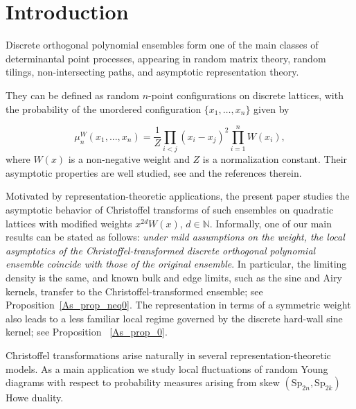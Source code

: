 \documentclass[reqno,11pt]{amsart}
\newcommand{\NN}{\mathbb{N}}
\theoremstyle{plain}
\theoremstyle{definition}
\numberwithin{equation}{section}
\begin{document}
\section{Introduction}

Discrete orthogonal polynomial ensembles form one of the main classes of determinantal point processes, appearing in random matrix theory, random tilings, non-intersecting paths, and asymptotic representation theory.

They can be defined as random $n$-point configurations on discrete lattices, with the probability of the unordered configuration $\{x_1,\ldots,x_n\}$ given by

$$
\mu^{W}_n(x_1,...,x_n)=\frac{1}{Z}\prod\limits_{i<j}(x_i-x_j)^2\prod\limits_{i=1}^n W(x_i),
$$
where $W(x)$ is a non-negative weight and $Z$ is a normalization constant. 
Their asymptotic properties are well studied, see \cite{baik2007discrete, johansson2002non, Borodin_2017} and the references therein. 

Motivated by representation-theoretic applications, the present paper studies the asymptotic behavior of Christoffel transforms of such ensembles on quadratic lattices with modified weights $x^{2d}W(x)$, $d\in\NN$. Informally, one of our main results can be stated as follows: \emph{under mild assumptions on the weight, the local asymptotics of the Christoffel-transformed discrete orthogonal polynomial ensemble coincide with those of the original ensemble}. In particular, the limiting density is the same, and known bulk and edge limits, such as the sine and Airy kernels, transfer to the Christoffel-transformed ensemble; see Proposition~\ref{As_prop_neq0}. The representation in terms of a symmetric weight also leads to a less familiar local regime governed by the discrete hard-wall sine kernel; see Proposition ~\ref{As_prop_0}.

Christoffel transformations arise naturally in several representation-theoretic models. As a main application we study local fluctuations of random Young diagrams with respect to probability measures arising from skew $(\mathrm{Sp}_{2n},\mathrm{Sp}_{2k})$ Howe duality.
\end{document}
